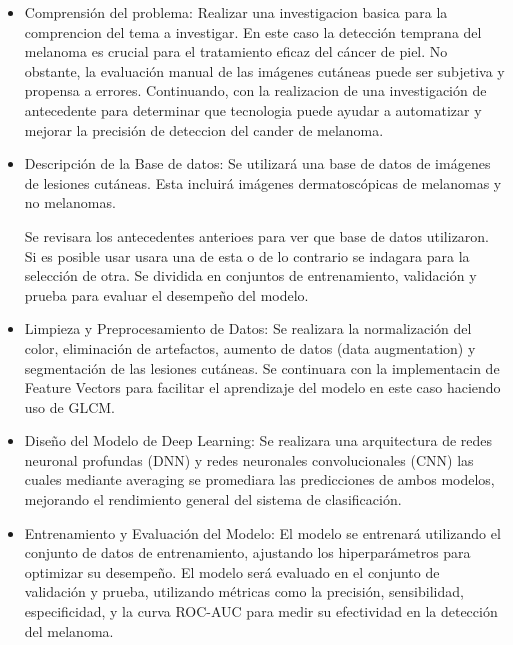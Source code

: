 \newcommand{\MIPone}{Comprensión del problema: 
	Realizar una investigacion basica para la comprencion del tema a investigar. En este caso la detección temprana del melanoma es crucial para el tratamiento eficaz del cáncer de piel. No obstante, la evaluación manual de las imágenes cutáneas puede ser subjetiva y propensa a errores. Continuando, con la realizacion de una investigación de antecedente para determinar que tecnologia puede ayudar a automatizar y mejorar la precisión de deteccion del cander de melanoma.
	
}
\newcommand{\MIPtwo}{Descripción de la Base de datos: Se utilizará una base de datos de imágenes de lesiones cutáneas. Esta incluirá imágenes dermatoscópicas de melanomas y no melanomas.

Se revisara los antecedentes anterioes para ver que base de datos utilizaron. Si es posible usar usara una de esta o de lo contrario se indagara para la selección de otra.
Se dividida en conjuntos de entrenamiento, validación y prueba para evaluar el desempeño del modelo.
	
}
\newcommand{\MIPthree}{Limpieza y Preprocesamiento de Datos: 
	Se realizara la normalización del color, eliminación de artefactos, aumento de datos (data augmentation) y segmentación de las lesiones cutáneas. Se continuara con la implementacin de Feature Vectors para facilitar el aprendizaje del modelo en este caso haciendo uso de GLCM.  
	
	
}
\newcommand{\MIPfour}{Diseño del Modelo de Deep Learning:
	Se realizara una arquitectura de redes neuronal profundas (DNN) y redes neuronales convolucionales (CNN) las cuales mediante averaging se promediara las predicciones de ambos modelos, mejorando el rendimiento general del sistema de clasificación.
	

}
\newcommand{\MIPfive}{Entrenamiento y Evaluación del Modelo: El modelo se entrenará utilizando el conjunto de datos de entrenamiento, ajustando los hiperparámetros para optimizar su desempeño. El modelo será evaluado en el conjunto de validación y prueba, utilizando métricas como la precisión, sensibilidad, especificidad, y la curva ROC-AUC para medir su efectividad en la detección del melanoma.
	
}




\begin{itemize}
	\item \MIPone
	\item \MIPtwo
	\item \MIPthree
	\item \MIPfour
	\item \MIPfive
	
\end{itemize}

